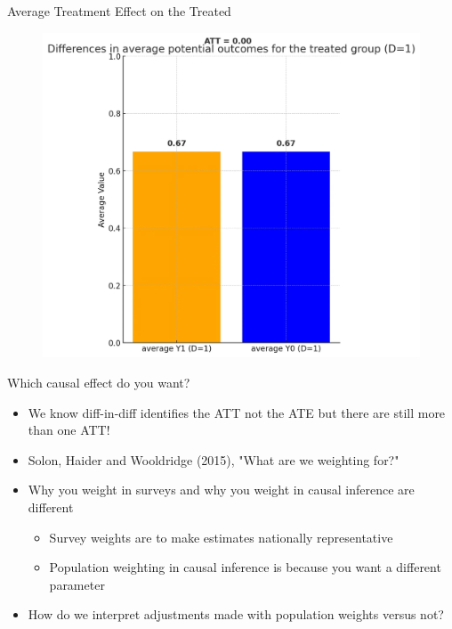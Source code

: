 \documentclass{beamer}
\begin{document}
\begin{frame}{Average Treatment Effect on the Treated}

\begin{figure}
    \centering
    \includegraphics[height=0.8\textheight]{./lecture_includes/step1_att}
\end{figure}


\end{frame}



\begin{frame}{Which causal effect do you want?}

\begin{itemize}
\item We know diff-in-diff identifies the ATT not the ATE but there are still more than one ATT!
\item Solon, Haider and Wooldridge (2015), "What are we weighting for?"
\item Why you weight in surveys and why you weight in causal inference are different
	\begin{itemize}
	\item Survey weights are to make estimates nationally representative
	\item Population weighting in causal inference is because you want a different parameter
	\end{itemize}
\item How do we interpret adjustments made with population weights versus not?
\end{itemize}

\end{frame}
\end{document}
